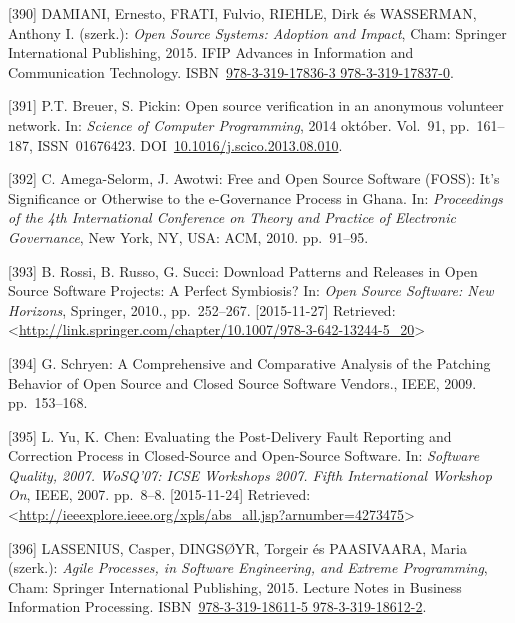 \documentclass[12pt,magyar,a4paper,oneside]{scrreprt}
\begin{document}
\leavevmode\hypertarget{ref-damiani_open_2015}{}%
{[}390{]} DAMIANI, Ernesto, FRATI, Fulvio, RIEHLE, Dirk és WASSERMAN,
Anthony I. (szerk.): \emph{Open Source Systems: Adoption and Impact},
Cham: Springer International Publishing, 2015. IFIP Advances in
Information and Communication Technology.
ISBN~\href{https://worldcat.org/isbn/978-3-319-17836-3\%20978-3-319-17837-0}{978-3-319-17836-3 978-3-319-17837-0}.

\leavevmode\hypertarget{ref-breuer_open_2014}{}%
{[}391{]} P.T. Breuer, S. Pickin: Open source verification in an
anonymous volunteer network. In: \emph{Science of Computer Programming},
2014 október. Vol.~91, pp.~161--187, ISSN~01676423.
DOI~\href{https://doi.org/10.1016/j.scico.2013.08.010}{10.1016/j.scico.2013.08.010}.

\leavevmode\hypertarget{ref-amega-selorm_free_2010}{}%
{[}392{]} C. Amega-Selorm, J. Awotwi: Free and Open Source Software
(FOSS): It's Significance or Otherwise to the e-Governance Process in
Ghana. In: \emph{Proceedings of the 4th International Conference on
Theory and Practice of Electronic Governance}, New York, NY, USA: ACM,
2010. pp.~91--95.

\leavevmode\hypertarget{ref-rossi_download_2010}{}%
{[}393{]} B. Rossi, B. Russo, G. Succi: Download Patterns and Releases
in Open Source Software Projects: A Perfect Symbiosis? In: \emph{Open
Source Software: New Horizons}, Springer, 2010., pp.~252--267.
{[}2015-11-27{]} Retrieved:
\textless{}\url{http://link.springer.com/chapter/10.1007/978-3-642-13244-5_20}\textgreater{}

\leavevmode\hypertarget{ref-schryen_comprehensive_2009}{}%
{[}394{]} G. Schryen: A Comprehensive and Comparative Analysis of the
Patching Behavior of Open Source and Closed Source Software Vendors.,
IEEE, 2009. pp.~153--168.

\leavevmode\hypertarget{ref-yu_evaluating_2007}{}%
{[}395{]} L. Yu, K. Chen: Evaluating the Post-Delivery Fault Reporting
and Correction Process in Closed-Source and Open-Source Software. In:
\emph{Software Quality, 2007. WoSQ'07: ICSE Workshops 2007. Fifth
International Workshop On}, IEEE, 2007. pp.~8--8. {[}2015-11-24{]}
Retrieved:
\textless{}\url{http://ieeexplore.ieee.org/xpls/abs_all.jsp?arnumber=4273475}\textgreater{}

\leavevmode\hypertarget{ref-lassenius_agile_2015}{}%
{[}396{]} LASSENIUS, Casper, DINGSØYR, Torgeir és PAASIVAARA, Maria
(szerk.): \emph{Agile Processes, in Software Engineering, and Extreme
Programming}, Cham: Springer International Publishing, 2015. Lecture
Notes in Business Information Processing.
ISBN~\href{https://worldcat.org/isbn/978-3-319-18611-5\%20978-3-319-18612-2}{978-3-319-18611-5 978-3-319-18612-2}.
\end{document}
